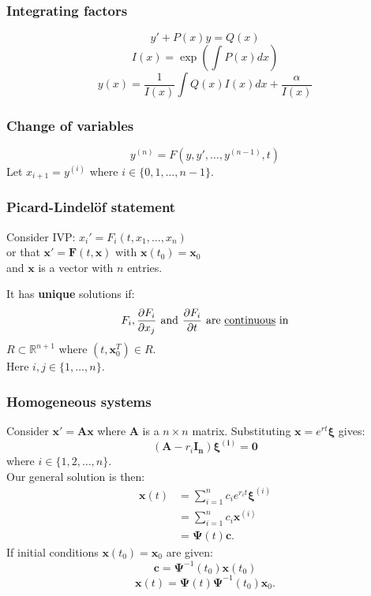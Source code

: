 \documentclass{article}
\newcommand{\matr}[1]{\mathbf{#1}}
\begin{document}
\begin{multicols}{3}
\noindent

\subsubsection*{Integrating factors}
$$y'+P(x)y=Q(x)$$
$$I(x)=\exp\left(\int P(x)dx\right)$$
$$y(x)=\frac{1}{I(x)} \int Q(x)I(x)dx + \frac{\alpha}{I(x)}$$

\subsubsection*{Change of variables}
$$y^{(n)} = F(y, y', \dots, y^{(n-1)}, t)$$
Let $x_{i+1} = y^{(i)}$ where $i \in \{0, 1, \dots, n-1\}$.

\subsubsection*{Picard-Lindel{\"o}f statement}
Consider IVP: $x_{i}'=F_i(t, x_1, \dots, x_n)$ \\
or that $\boldsymbol{x}'=\boldsymbol{F}(t,\boldsymbol{x})$
with $\boldsymbol{x}(t_0)=\boldsymbol{x}_0$ \\
and $\boldsymbol{x}$ is a vector with $n$ entries.

It has \textbf{unique} solutions if:
$$F_i, \frac{\partial F_i}{\partial x_j}
\hspace{0.05in}\text{and}\hspace{0.05in}
\frac{\partial F_i}{\partial t}
\hspace{0.05in}\text{are \underline{continuous} in}$$
$R\subset\mathbb{R}^{n+1}$ where $(t,\boldsymbol{x}_0^{T})\in R$. \\
Here $i, j \in \{1, \dots, n\}$.

\subsubsection*{Homogeneous systems}
Consider $\boldsymbol{x}'=\matr{A}\boldsymbol{x}$
where $\matr{A}$ is a $n \times n$ matrix.
Substituting $\boldsymbol{x}=e^{rt} \boldsymbol{\xi}$ gives:
$$(\matr{A}-r_i \matr{I_n})
\boldsymbol{\xi^{(i)}}=\boldsymbol{0}$$
where $i\in\{1,2,\dots, n\}$. \\ Our general solution is then:
\begin{align*}
    \boldsymbol{x}(t)
    &=\sum_{i=1}^{n}c_i e^{r_i t}\boldsymbol{\xi}^{(i)} \\
    &=\sum_{i=1}^{n}c_i\boldsymbol{x}^{(i)} \\
    &=\boldsymbol{\Psi}(t)\boldsymbol{c}.
\end{align*}
If initial conditions $\boldsymbol{x}(t_0)=\boldsymbol{x}_0$
are given:
$$\boldsymbol{c}=\boldsymbol{\Psi}^{-1}(t_0)\boldsymbol{x}(t_0)$$
$$\boldsymbol{x}(t)=\boldsymbol{\Psi}(t)
\boldsymbol{\Psi}^{-1}(t_0)\boldsymbol{x}_0.$$


\end{multicols}
\end{document}
